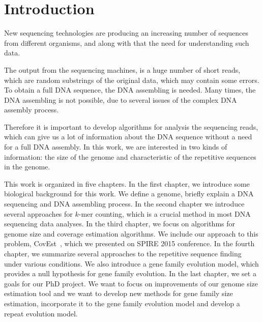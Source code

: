 \chapter*{Introduction}
{}

New sequencing technologies are producing an increasing number of sequences from different organisms, and along with that the need for understanding such data.

The output from the sequencing machines, is a huge number of short reads, which are random substrings of the original data, which may contain some errors. To obtain a full DNA sequence, the DNA assembling is needed. Many times, the DNA assembling is not possible, due to several issues of the complex DNA assembly process.

Therefore it is important to develop algorithms for analysis the sequencing reads, which can give us a lot of information about the DNA sequence without a need for a full DNA assembly.
In this work, we are interested in two kinds of information: the size of the genome and characteristic of the repetitive sequences in the genome.

This work is organized in five chapters.
In the first chapter, we introduce some biological background for this work. We define a genome, briefly explain a DNA sequencing and DNA assembling process.
In the second chapter we introduce several approaches for $k$-mer counting, which is a crucial method in most DNA sequencing data analyses.
In the third chapter, we focus on algorithms for genome size and coverage estimation algorithms. We include our approach to this problem, CovEst~\cite{covest}, which we presented on SPIRE 2015 conference.
In the fourth chapter, we summarize several approaches to the repetitive sequence finding under various conditions. We also introduce a gene family evolution model, which provides a null hypothesis for gene family evolution.
In the last chapter, we set a goals for our PhD project. We want to focus on improvements of our genome size estimation tool and we want to develop new methods for gene family size estimation, incorporate it to the gene family evolution model and develop a repeat evolution model.

